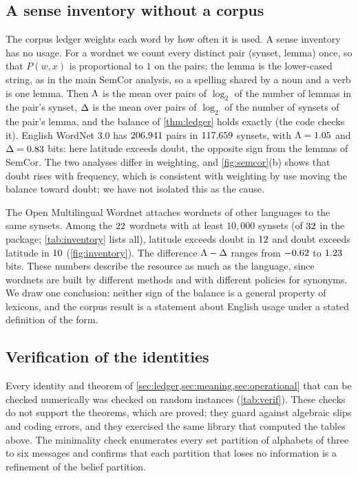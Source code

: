 \subsection{A sense inventory without a corpus}\label{sec:inventory}
The corpus ledger weights each word by how often it is used. A sense inventory has no usage. For a wordnet we count every distinct pair (synset, lemma) once, so that $P(w,x)$ is proportional to $1$ on the pairs; the lemma is the lower-cased string, as in the main SemCor analysis, so a spelling shared by a noun and a verb is one lemma. Then $\Lambda$ is the mean over pairs of $\log_2$ of the number of lemmas in the pair's synset, $\Delta$ is the mean over pairs of $\log_2$ of the number of synsets of the pair's lemma, and the balance of \cref{thm:ledger} holds exactly (the code checks it). English WordNet 3.0 has $206{,}941$ pairs in $117{,}659$ synsets, with $\Lambda=1.05$ and $\Delta=0.83$ bits: here latitude exceeds doubt, the opposite sign from the lemmas of SemCor. The two analyses differ in weighting, and \cref{fig:semcor}(b) shows that doubt rises with frequency, which is consistent with weighting by use moving the balance toward doubt; we have not isolated this as the cause.

The Open Multilingual Wordnet \citep{bond2013} attaches wordnets of other languages to the same synsets. Among the $22$ wordnets with at least $10{,}000$ synsets (of $32$ in the package; \cref{tab:inventory} lists all), latitude exceeds doubt in $12$ and doubt exceeds latitude in $10$ (\cref{fig:inventory}). The difference $\Lambda-\Delta$ ranges from $-0.62$ to $1.23$ bits. These numbers describe the resource as much as the language, since wordnets are built by different methods and with different policies for synonyms. We draw one conclusion: neither sign of the balance is a general property of lexicons, and the corpus result is a statement about English usage under a stated definition of the form.


\subsection{Verification of the identities}
Every identity and theorem of \cref{sec:ledger,sec:meaning,sec:operational} that can be checked numerically was checked on random instances (\cref{tab:verif}). These checks do not support the theorems, which are proved; they guard against algebraic slips and coding errors, and they exercised the same library that computed the tables above. The minimality check enumerates every set partition of alphabets of three to six messages and confirms that each partition that loses no information is a refinement of the belief partition.
\begin{table}[tbp]
\caption{Randomized verification of the identities and theorems ($\VerN$ random joint laws for the first block).}\label{tab:verif}
\centering\small

\end{table}
